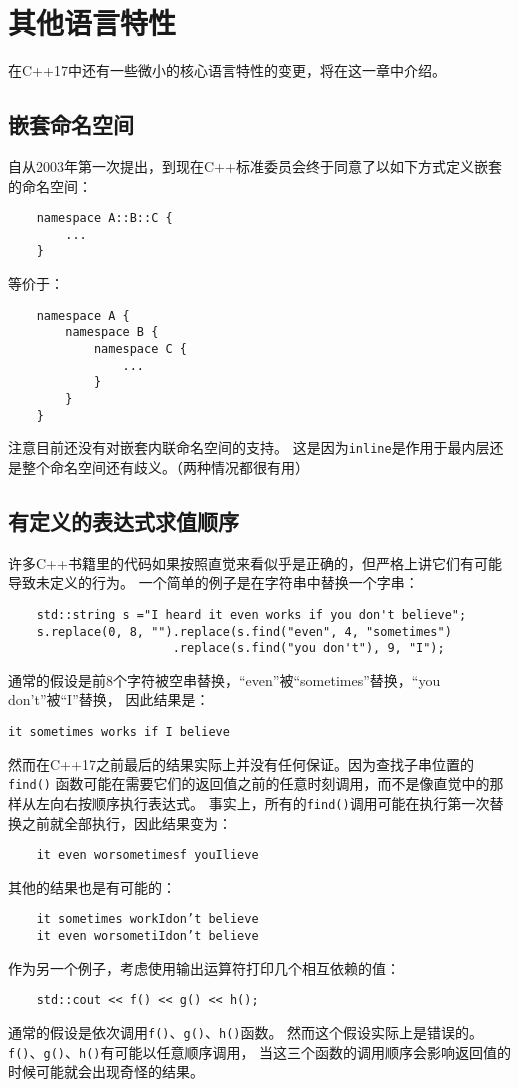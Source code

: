 \section{其他语言特性}\label{ch8}
在C++17中还有一些微小的核心语言特性的变更，将在这一章中介绍。

\subsection{嵌套命名空间}\label{ch8.1}
自从2003年第一次提出，到现在C++标准委员会终于同意了以如下方式定义嵌套的命名空间：
\begin{lstlisting}
    namespace A::B::C {
        ...
    }
\end{lstlisting}
等价于：
\begin{lstlisting}
    namespace A {
        namespace B {
            namespace C {
                ...
            }
        }
    }
\end{lstlisting}
注意目前还没有对嵌套内联命名空间的支持。
这是因为\texttt{inline}是作用于最内层还是整个命名空间还有歧义。（两种情况都很有用）

\subsection{有定义的表达式求值顺序}\label{ch8.2}
许多C++书籍里的代码如果按照直觉来看似乎是正确的，但严格上讲它们有可能导致未定义的行为。
一个简单的例子是在字符串中替换一个字串：
\begin{lstlisting}
    std::string s ="I heard it even works if you don't believe";
    s.replace(0, 8, "").replace(s.find("even", 4, "sometimes")
                       .replace(s.find("you don't"), 9, "I");
\end{lstlisting}
通常的假设是前8个字符被空串替换，“even”被“sometimes”替换，“you don't”被“I”替换，
因此结果是：
\begin{lstlisting}[keywordstyle=\color{black}]
    it sometimes works if I believe
\end{lstlisting}
然而在C++17之前最后的结果实际上并没有任何保证。因为查找子串位置的\texttt{find()}
函数可能在需要它们的返回值之前的任意时刻调用，而不是像直觉中的那样从左向右按顺序执行表达式。
事实上，所有的\texttt{find()}调用可能在执行第一次替换之前就全部执行，因此结果变为：

\begin{lstlisting}
    it even worsometimesf youIlieve
\end{lstlisting}
其他的结果也是有可能的：
\begin{lstlisting}
    it sometimes workIdon’t believe
    it even worsometiIdon’t believe
\end{lstlisting}
作为另一个例子，考虑使用输出运算符打印几个相互依赖的值：
\begin{lstlisting}
    std::cout << f() << g() << h();
\end{lstlisting}
通常的假设是依次调用\texttt{f()}、\texttt{g()}、\texttt{h()}函数。
然而这个假设实际上是错误的。\texttt{f()}、\texttt{g()}、\texttt{h()}有可能以任意顺序调用，
当这三个函数的调用顺序会影响返回值的时候可能就会出现奇怪的结果。

